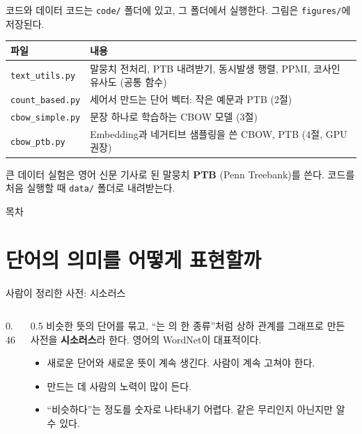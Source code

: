 \documentclass[aspectratio=169,11pt]{beamer}
\begin{document}
\begin{frame}{코드와 데이터}
코드는 \texttt{code/} 폴더에 있고, 그 폴더에서 실행한다. 그림은 \texttt{figures/}에 저장된다.
\vskip2mm
\centering
\begin{tabular}{@{}lp{98mm}@{}}
\toprule
파일 & 내용 \\
\midrule
\texttt{text\_utils.py} & 말뭉치 전처리, PTB 내려받기, 동시발생 행렬, PPMI, 코사인 유사도 (공통 함수) \\
\texttt{count\_based.py} & 세어서 만드는 단어 벡터: 작은 예문과 PTB (2절) \\
\texttt{cbow\_simple.py} & 문장 하나로 학습하는 CBOW 모델 (3절) \\
\texttt{cbow\_ptb.py} & Embedding과 네거티브 샘플링을 쓴 CBOW, PTB (4절, GPU 권장) \\
\bottomrule
\end{tabular}
\vskip3mm
\raggedright
큰 데이터 실험은 영어 신문 기사로 된 말뭉치 \textbf{PTB} (Penn Treebank)를 쓴다.
코드를 처음 실행할 때 \texttt{data/} 폴더로 내려받는다.
\end{frame}

\begin{frame}{목차}
\tableofcontents
\end{frame}

\section{단어의 의미를 어떻게 표현할까}

\begin{frame}{사람이 정리한 사전: 시소러스}
\begin{columns}[T,onlytextwidth]
\begin{column}{0.46\textwidth}
\end{column}
\begin{column}{0.5\textwidth}
비슷한 뜻의 단어를 묶고, ``는 의 한 종류''처럼 상하 관계를 그래프로 만든 사전을 \textbf{시소러스}라 한다.
영어의 WordNet이 대표적이다.
\vskip2mm
\begin{remarkbox}[문제]
\begin{itemize}
\item 새로운 단어와 새로운 뜻이 계속 생긴다. 사람이 계속 고쳐야 한다.
\item 만드는 데 사람의 노력이 많이 든다.
\item ``비슷하다''는 정도를 숫자로 나타내기 어렵다. 같은 무리인지 아닌지만 알 수 있다.
\end{itemize}
\end{remarkbox}
\end{column}
\end{columns}
\end{frame}
\end{document}
